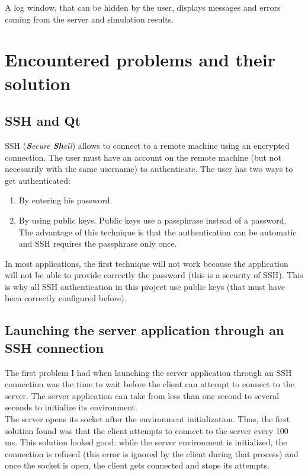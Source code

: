 A log window, that can be hidden by the user, displays messages and errors
coming from the server and simulation results.

\section{Encountered problems and their solution}

\subsection{SSH and Qt}
\label{sshAndQt}

SSH (\textit{\textbf{S}ecure \textbf{Sh}ell}) allows to connect to a remote
machine using an encrypted connection. The user must have an account on the
remote machine (but not necessarily with the same username) to authenticate. The
user has two ways to get authenticated:
\begin{enumerate}
 \item By entering his password.
 \item By using public keys. Public keys use a passphrase instead of a
password. The advantage of this technique is that the authentication can be
automatic and SSH requires the passphrase only once.
\end{enumerate}

In most applications, the first technique will not work because the application
will not be able to provide correctly the password (this is a security of SSH).
This is why all SSH authentication in this project use public keys (that must
have been correctly configured before).

\subsection{Launching the server application through an SSH connection}

The first problem I had when launching the server application through an SSH
connection was the time to wait before the client can attempt to connect to the
server. The server application can take from less than one second to several
seconds to initialize its environment. \\

The server opens its socket after the environment initialization. Thus, the
first solution found was that the client attempts to connect to the server
every 100 ms. This solution looked good: while the server environment is
initialized, the connection is refused (this error is ignored by the client
during that process) and once the socket is open, the client gets connected and
stops its attempts.\\

